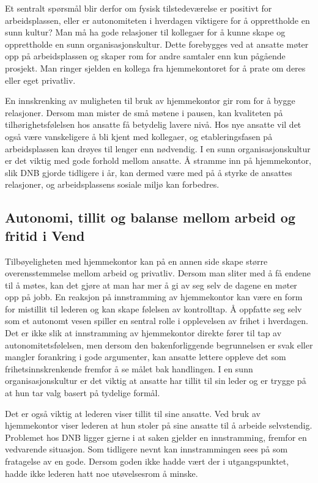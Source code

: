 Et sentralt spørsmål blir derfor om fysisk tilstedeværelse er positivt for arbeidsplassen, eller er autonomiteten i hverdagen viktigere for å opprettholde en sunn kultur? Man må ha gode relasjoner til kollegaer for å kunne skape og opprettholde en sunn organisasjonskultur. Dette forebygges ved at ansatte møter opp på arbeidsplassen og skaper rom for andre samtaler enn kun pågående prosjekt. Man ringer sjelden en kollega fra hjemmekontoret for å prate om deres eller eget privatliv.

En innskrenking av muligheten til bruk av hjemmekontor gir rom for å bygge relasjoner. Dersom man mister de små møtene i pausen, kan kvaliteten på tilhørighetsfølelsen hos ansatte få betydelig lavere nivå. Hos nye ansatte vil det også være vanskeligere å bli kjent med kollegaer, og etableringsfasen på arbeidsplassen kan drøyes til lenger enn nødvendig. I en sunn organisasjonskultur er det viktig med gode forhold mellom ansatte. Å stramme inn på hjemmekontor, slik DNB gjorde tidligere i år, kan dermed være med på å styrke de ansattes relasjoner, og arbeidsplassens sosiale miljø kan forbedres.

\subsection{Autonomi, tillit og balanse mellom arbeid og fritid i Vend}

Tilbøyeligheten med hjemmekontor kan på en annen side skape større overensstemmelse mellom arbeid og privatliv. Dersom man sliter med å få endene til å møtes, kan det gjøre at man har mer å gi av seg selv de dagene en møter opp på jobb. En reaksjon på innstramming av hjemmekontor kan være en form for mistillit til lederen og kan skape følelsen av kontrolltap. Å oppfatte seg selv som et autonomt vesen spiller en sentral rolle i opplevelsen av frihet i hverdagen. Det er ikke slik at innstramming av hjemmekontor direkte fører til tap av autonomitetsfølelsen, men dersom den bakenforliggende begrunnelsen er svak eller mangler forankring i gode argumenter, kan ansatte lettere oppleve det som frihetsinnskrenkende fremfor å se målet bak handlingen. I en sunn organisasjonskultur er det viktig at ansatte har tillit til sin leder og er trygge på at hun tar valg basert på tydelige formål.

Det er også viktig at lederen viser tillit til sine ansatte. Ved bruk av hjemmekontor viser lederen at hun stoler på sine ansatte til å arbeide selvstendig. Problemet hos DNB ligger gjerne i at saken gjelder en innstramming, fremfor en vedvarende situasjon. Som tidligere nevnt kan innstrammingen sees på som fratagelse av en gode. Dersom goden ikke hadde vært der i utgangspunktet, hadde ikke lederen hatt noe utøvelsesrom å minske.

